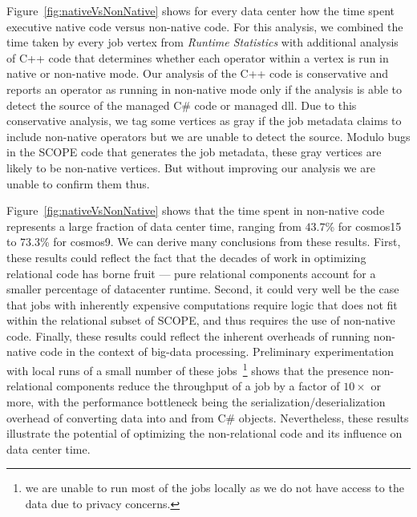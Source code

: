 
Figure~\ref{fig:nativeVsNonNative} shows for every data center how the time spent executive native code versus non-native code. 
For this analysis, we combined the time taken by every job vertex from \emph{Runtime Statistics} with additional analysis of C++ code that determines whether each operator within a vertex is run in native or non-native mode. 
Our analysis of the C++ code is conservative and reports an operator as running in non-native mode only if the analysis is able to detect the source of the managed C\# code or managed dll. 
Due to this conservative analysis, we tag some vertices as gray if the job metadata claims to include non-native operators but we are unable to detect the source. 
Modulo bugs in the SCOPE code that generates the job metadata, these gray vertices are likely to be non-native vertices. But without improving our analysis we are unable to confirm them thus. 


Figure~\ref{fig:nativeVsNonNative} shows that the time spent in non-native code represents a large fraction of data center time, ranging from $43.7$\% for cosmos15 to $73.3$\% for cosmos9. 
We can derive many conclusions from these results. First, these results could reflect the fact that the decades of work in optimizing relational code has borne fruit --- pure relational components account for a smaller percentage of datacenter runtime. Second, it could very well be the case that jobs with inherently expensive computations require logic that does not fit within the relational subset of SCOPE, and thus requires the use of non-native code. Finally,
these results could reflect the inherent overheads of running non-native code in the context of big-data processing. Preliminary experimentation with local runs of a small number of these jobs~\footnote{we are unable to run most of the jobs locally as we do not have access to the data due to privacy concerns.} shows that the presence non-relational components reduce the throughput of a job by a factor of $10\times$ or more, with the performance bottleneck being the serialization/deserialization overhead of converting data into and from C\# objects. Nevertheless, 
these results illustrate the potential of optimizing the non-relational code and its influence on data center time.


